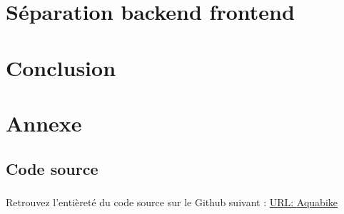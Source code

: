 \documentclass[12pt,oneside]{report}
\newcommand{\Href}[2]{\href{#1}{URL: \underline{#2}}}
\begin{document}
	\vspace{\baselineskip}
	

\chapter{Séparation backend frontend}
\label{chap:Séparation backend frontend}

	\vspace{\baselineskip}
	

\chapter{Conclusion}
\label{chap:Conclusion}

	\vspace{\baselineskip}
	

\newpage
\chapter{Annexe}
	 \label{chap:Annexe}
	
	\vspace{\baselineskip}
	\section{Code source}
		\paragraph{}
			Retrouvez l'entièreté du code source sur le Github suivant : \Href{https://github.com/victorsmits/Aquabike}{Aquabike}
			
\end{document}
